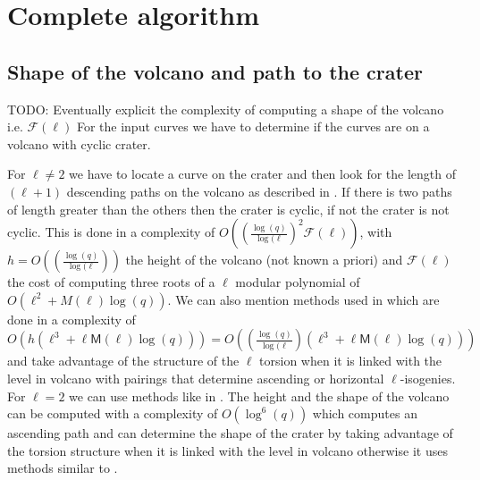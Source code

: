 \documentclass{lms}
\newcommand{\todo}[1]{{\color{red}TODO: #1}}
\begin{document}
\section{Complete algorithm}
\label{sec:complete-algorithm}
\subsection{Shape of the volcano and path to the crater}
	\label{sub:shape-volcano}
\todo{Eventually explicit the complexity of computing a shape of the volcano i.e. $\mathcal{F}(\ell)$}
  For the input curves we have to determine if the curves are on a volcano with cyclic crater. 
  
  For $\ell \neq 2$ we have to locate a curve on the crater and then look for  the length of $(\ell+1)$ descending paths on the volcano as described in \cite{volcano}. If there is two paths of length greater than the others then the crater is cyclic, if not the crater is not cyclic. This is done in a complexity of $O( ( \frac{\log(q)}{\log(\ell})^2 \mathcal{F}(\ell) )$, with $h=O(( \frac{\log(q)}{\log(\ell}))$ the height of the volcano (not known a priori) and $\mathcal{F}(\ell)$ the cost of computing three roots of a $\ell$ modular polynomial of $O(\ell^2+M(\ell)\log(q))$. We can also mention methods used in \cite{IonicaJ10} which are done in a complexity of $O(h(\ell^3+\ell \mathsf{M}(\ell) \log(q)))=O(( \frac{\log(q)}{\log(\ell})(\ell^3+\ell \mathsf{M}(\ell) \log(q)))$ and take advantage of the structure of the $\ell$ torsion when it is linked with the level in volcano with pairings that determine ascending or horizontal $\ell$-isogenies. %
\newline 
For $\ell=2$ we can use methods like in \cite{MiretMRV05}. The height and the shape of the volcano can be computed with a complexity of $O(\log^6(q))$ which computes an ascending path and can determine the shape of the crater by taking advantage of the torsion structure when it is linked with the level in volcano otherwise it uses methods similar to \cite{volcano}.
  
\end{document}
